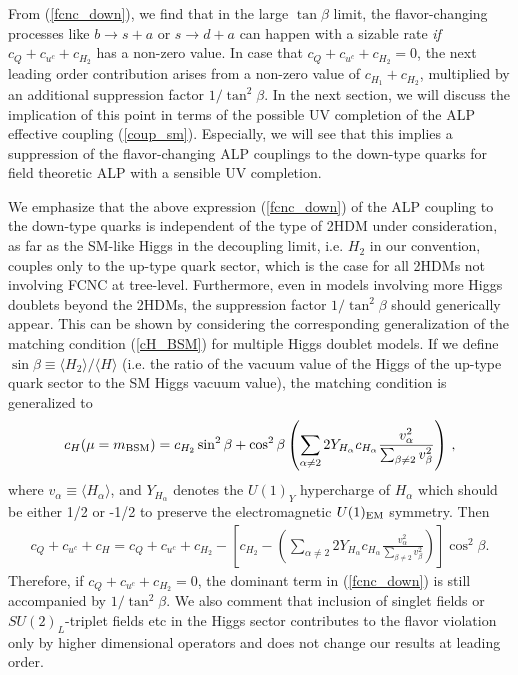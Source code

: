 \documentclass[preprint,prd,aps,tighten,nofootinbib,amssymb]{revtex4}
\newcommand{\dis}[1]{\begin{equation}\begin{split}#1\end{split}\end{equation}}
\begin{document}
From (\ref{fcnc_down}), we find that in the large $\tan\beta$ limit, the flavor-changing processes like $b \rightarrow s+ a$ or $s \rightarrow d+ a$  can happen with a sizable rate {\it if} $c_Q + c_{u^c} + c_{H_2}$  has a non-zero value. 
In case that $c_Q + c_{u^c} + c_{H_2}=0$, the next leading order contribution arises from a non-zero value of $c_{H_1} + c_{H_2}$, multiplied by an additional suppression factor $1/\tan^2 \beta$.
In the next section, we will discuss the implication of this point in terms of the possible UV completion of the ALP effective coupling (\ref{coup_sm}).
Especially, we will see that this  implies a suppression of the flavor-changing ALP couplings to the down-type quarks for field theoretic ALP with a sensible UV completion.

We emphasize that the above expression (\ref{fcnc_down}) of the ALP coupling to the down-type quarks  is independent of the type of 2HDM under consideration, as far as the SM-like Higgs in the decoupling limit, i.e. $H_2$ in our convention,   couples only to the up-type quark sector, which is the case for all 2HDMs not involving FCNC at tree-level.
Furthermore, even in models involving more Higgs doublets beyond the 2HDMs, the suppression factor $1/\tan^2 \beta$ should generically appear.  
This can be shown by considering the corresponding generalization of the matching condition (\ref{cH_BSM}) for multiple Higgs doublet models.
If we define $\sin \beta \equiv \langle H_2 \rangle/\langle H \rangle$ (i.e. the ratio of the vacuum value of the Higgs of the up-type quark sector to the SM Higgs vacuum value), 
the matching condition is generalized to
\dis{
 c_H(\mu=m_{\rm BSM})=c_{H_2}\sin^2\beta + \cos^2\beta \left( \sum_{\alpha \neq 2} 2 Y_{H_\alpha} c_{H_\alpha} \frac{v_\alpha^2}{\sum_{\beta \neq 2} v_\beta^2}  \right) \, ,
 }
where $v_{\alpha} \equiv \langle H_\alpha \rangle$, and $Y_{H_\alpha}$ denotes the $U(1)_Y$ hypercharge of $H_{\alpha}$ which should be either 1/2 or -1/2 to preserve the electromagnetic
$U(1)_{\rm EM}$ symmetry. 
Then
\dis{
c_{Q} + c_{u^c} + c_H = c_{Q} + c_{u^c} + c_{H_2} - \left[ c_{H_2} - \left( \sum_{\alpha \neq 2} 2 Y_{H_\alpha} c_{H_\alpha} \frac{v_\alpha^2}{\sum_{\beta \neq 2} v_\beta^2}  \right)
\right] \cos^2 \beta.
}
Therefore, if $c_{Q} + c_{u^c} + c_{H_2} = 0$, the dominant term in (\ref{fcnc_down}) is still accompanied by $1/\tan^2 \beta$.
We also comment that inclusion of singlet fields or $SU(2)_L$-triplet fields etc in the Higgs sector contributes to the flavor violation only by higher dimensional operators and does not change our results at leading order.    
\end{document}
